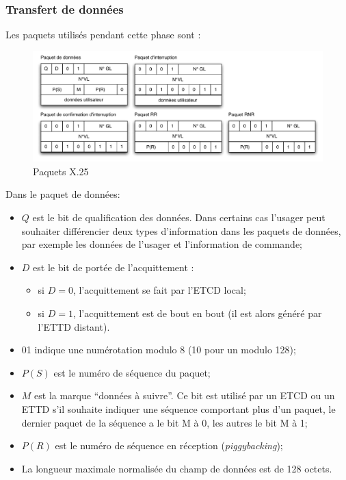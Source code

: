 \documentclass[11pt,english,french]{scrreprt}
\theoremstyle{remark}
\theoremstyle{definition}
\begin{document}
\clearpage

\subsubsection*{Transfert de données} %

Les paquets utilisés pendant cette phase sont :

\begin{figure}[h!]
	\center
	\includegraphics[scale=.7]{graphes/paquets-X25}
	\caption{Paquets X.25}
\end{figure}

Dans le paquet de données:
\begin{itemize}
	\item $Q$ est le bit de qualification des données. Dans certains cas l'usager peut souhaiter différencier deux types d'information dans les paquets de données, par exemple les données de l'usager et l'information de commande;
	\item $D$ est le bit de portée de l'acquittement :\begin{itemize}
		\item si $D = 0$, l'acquittement se fait par l'ETCD local;
		\item si $D = 1$, l'acquittement est de bout en bout (il est alors généré par l'ETTD distant).
	\end{itemize}
	\item 01 indique une numérotation modulo 8 (10 pour un modulo 128);
	\item $P(S)$ est le numéro de séquence du paquet;
	\item $M$ est la marque ``données à suivre''. Ce bit est utilisé par un ETCD ou un ETTD s'il souhaite indiquer une séquence comportant plus d'un paquet, le dernier paquet de la séquence a le bit M à 0, les autres le bit M à 1;
	\item $P(R)$ est le numéro de séquence en réception (\emph{piggybacking});
	\item La longueur maximale normalisée du champ de données est de 128 octets.
\end{itemize}
\end{document}

